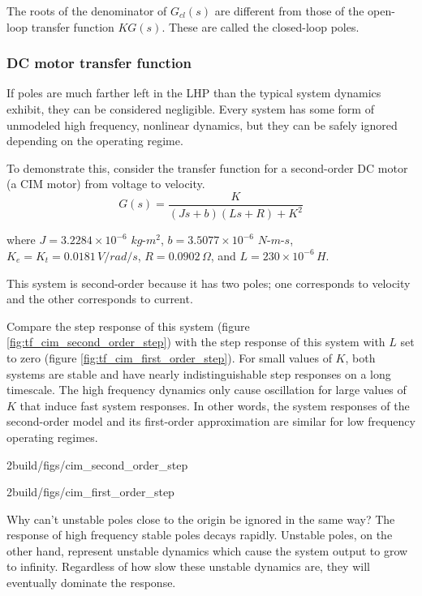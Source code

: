 The roots of the denominator of $G_{cl}(s)$ are different from those of the
open-loop transfer function $KG(s)$. These are called the closed-loop poles.

\subsubsection{DC motor transfer function}

If poles are much farther left in the LHP than the typical \gls{system} dynamics
exhibit, they can be considered negligible. Every \gls{system} has some form of
unmodeled high frequency, nonlinear dynamics, but they can be safely ignored
depending on the operating regime.

To demonstrate this, consider the transfer function for a second-order DC motor
(a CIM motor) from voltage to velocity.
\begin{equation*}
  G(s) = \frac{K}{(Js + b)(Ls + R) + K^2}
\end{equation*}

where $J = 3.2284 \times 10^{-6}$ $kg$-$m^2$, $b = 3.5077 \times 10^{-6}$
$N$-$m$-$s$, $K_e = K_t = 0.0181 \,V/rad/s$, $R = 0.0902 \,\Omega$, and
$L = 230 \times 10^{-6} \,H$.

This system is second-order because it has two poles; one corresponds to
velocity and the other corresponds to current.

Compare the step response of this \gls{system} (figure
\ref{fig:tf_cim_second_order_step}) with the step response of this \gls{system}
with $L$ set to zero (figure \ref{fig:tf_cim_first_order_step}). For small
values of $K$, both \glspl{system} are stable and have nearly indistinguishable
\glspl{step response} on a long timescale. The high frequency dynamics only
cause oscillation for large values of $K$ that induce fast
\glspl{system response}. In other words, the \glspl{system response} of the
second-order model and its first-order approximation are similar for low
frequency operating regimes.
\begin{bookfigure}
  \begin{minisvg}{2}{build/figs/cim_second_order_step}
    \caption{Second-order CIM motor model step response ($L = 230$ μH)}
    \label{fig:tf_cim_second_order_step}
  \end{minisvg}
  \hfill
  \begin{minisvg}{2}{build/figs/cim_first_order_step}
    \caption{First-order CIM motor model step response ($L = 0$ μH)}
    \label{fig:tf_cim_first_order_step}
  \end{minisvg}
\end{bookfigure}

Why can't unstable poles close to the origin be ignored in the same way? The
response of high frequency stable poles decays rapidly. Unstable poles, on the
other hand, represent unstable dynamics which cause the \gls{system}
\gls{output} to grow to infinity. Regardless of how slow these unstable dynamics
are, they will eventually dominate the response.
